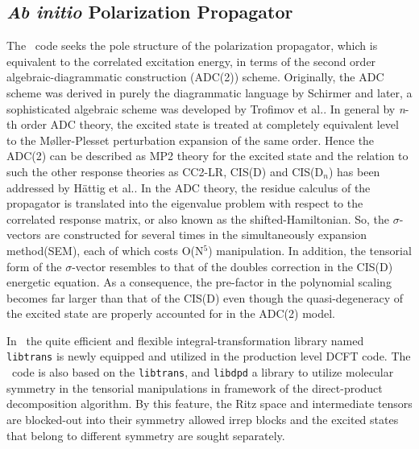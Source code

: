 \subsection{\textit{Ab initio} Polarization Propagator} \label{adc}

The \PSIadc\ code seeks the pole structure of the polarization propagator, which is equivalent to the correlated excitation energy, in terms of the second order algebraic-diagrammatic construction (ADC(2)) scheme. Originally, the ADC scheme was derived in purely the diagrammatic language by Schirmer\cite{Schirmer:1982} and later, a sophisticated algebraic scheme was developed by Trofimov et al.\cite{Trofimov:2006}. In general by \textit{n}-th order ADC theory, the excited state is treated at completely equivalent level to the M\o ller-Plesset perturbation expansion of the same order. Hence the ADC(2) can be described as MP2 theory for the excited state and the relation to such the other response theories as CC2-LR, CIS(D) and CIS(D${}_n$) has been addressed by H\"attig et al.\cite{Haettig:2002}. In the ADC theory, the residue calculus of the propagator is translated into the eigenvalue problem with respect to the correlated response matrix, or also known as the shifted-Hamiltonian. So, the $\sigma$-vectors are constructed for several times in the simultaneously expansion method(SEM), each of which costs O(N${}^5$) manipulation. In addition, the tensorial form of the $\sigma$-vector resembles to that of the doubles correction in the CIS(D) energetic equation. As a consequence, the pre-factor in the polynomial scaling becomes far larger than that of the CIS(D) even though the quasi-degeneracy of the excited state are properly accounted for in the ADC(2) model.

In \PSIfour\ the quite efficient and flexible integral-transformation library named {\tt libtrans} is newly equipped and utilized in the production level DCFT code. The \PSIadc\ code is also based on the {\tt libtrans}, and {\tt libdpd} a library to utilize molecular symmetry in the tensorial manipulations in framework of the direct-product decomposition algorithm. By this feature, the Ritz space and intermediate tensors are blocked-out into their symmetry allowed irrep blocks and the excited states that belong to different symmetry are sought separately.

